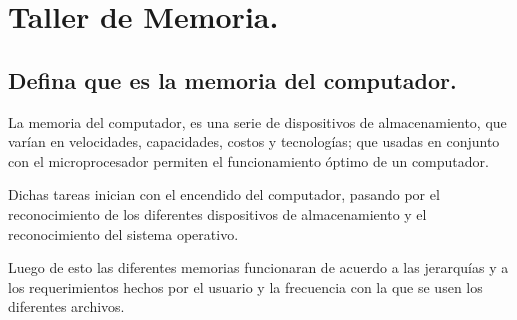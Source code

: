 \documentclass{article}
\begin{document}
\newpage
\section{Taller de Memoria.} \label{contenido}

\subsection{Defina que es la memoria del computador.}
\vspace{0.5cm}
\noindent
La memoria del computador, es una serie de dispositivos de almacenamiento, que varían en velocidades, capacidades, costos y tecnologías; que usadas en conjunto con el microprocesador permiten el funcionamiento óptimo de un computador. 

\vspace{0.5cm}
\noindent
Dichas tareas inician con el encendido del computador, pasando por el reconocimiento de los diferentes dispositivos de almacenamiento y el reconocimiento del sistema operativo.

\vspace{0.5cm}
\noindent
Luego de esto las diferentes memorias funcionaran de acuerdo a las jerarquías y a los requerimientos hechos por el usuario y la frecuencia con la que se usen los diferentes archivos. 
\end{document}
